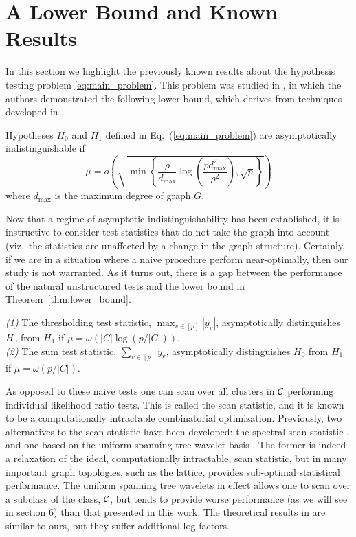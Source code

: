 \vspace{-.2cm}
\section{A Lower Bound and Known Results}
\label{sec:lower}
\vspace{-.2cm}
In this section we highlight the previously known results about the hypothesis testing problem \eqref{eq:main_problem}.
This problem was studied in \cite{sharpnack2012detecting}, in which the authors demonstrated the following lower bound, which derives from techniques developed in \cite{arias2008searching}.
\begin{theorem}{\cite{sharpnack2012detecting}}
\label{thm:lower_bound}
Hypotheses $H_0$ and $H_1$ defined in Eq.~(\ref{eq:main_problem}) are asymptotically indistinguishable if 
\[
\mu = o \left( \sqrt{\min\left\{\frac{\rho}{d_{\max}} \log \left( \frac{p d_{\max}^2}{\rho^2}\right), \sqrt{p} \right\}} \right)
\]
where $d_{\max}$ is the maximum degree of graph $G$. 
\end{theorem}
Now that a regime of asymptotic indistinguishability has been established, it is instructive to consider test statistics that do not take the graph into account (viz.~the statistics are unaffected by a change in the graph structure).
Certainly, if we are in a situation where a naive procedure perform near-optimally, then our study is not warranted.
As it turns out, there is a gap between the performance of the natural unstructured tests and the lower bound in Theorem~\ref{thm:lower_bound}.

\begin{proposition}{\cite{sharpnack2012detecting}}
{\em (1)} The thresholding test statistic, $\max_{v \in [p]} |y_v|$, asymptotically distinguishes $H_0$ from $H_1$ if $\mu = \omega (|C| \log (p/|C|))$.\\
{\em (2)} The sum test statistic, $\sum_{v \in [p]} y_v$, asymptotically distinguishes $H_0$ from $H_1$ if $\mu = \omega (p / |C|)$.
\end{proposition}

As opposed to these naive tests one can scan over all clusters in $\mathcal{C}$ performing individual likelihood ratio tests.
This is called the scan statistic, and it is known to be a computationally intractable combinatorial optimization.
Previously, two alternatives to the scan statistic have been developed: the spectral scan statistic \cite{sharpnack2012changepoint}, and one based on the uniform spanning tree wavelet basis \cite{sharpnack2012detecting}.
The former is indeed a relaxation of the ideal, computationally intractable, scan statistic, but in many important graph topologies, such as the lattice, provides sub-optimal statistical performance.
The uniform spanning tree wavelets in effect allows one to scan over a subclass of the class, $\mathcal{C}$, but tends to provide worse performance (as we will see in section 6) than that presented in this work.
The theoretical results in \cite{sharpnack2012detecting} are similar to ours, but they suffer additional log-factors.


